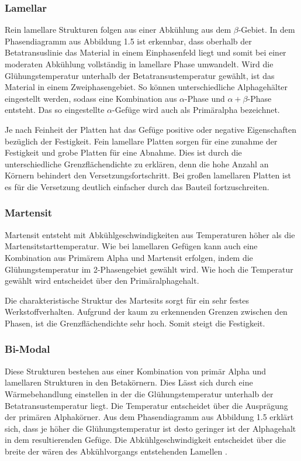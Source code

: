 \documentclass[a4paper, 11pt]{tubsreprt}
\begin{document}
\subsubsection{Lamellar}
Rein lamellare Strukturen folgen aus einer Abkühlung aus dem $\beta$-Gebiet. In dem Phasendiagramm aus Abbildung 1.5 ist erkennbar, dass oberhalb der Betatransuslinie das Material in einem Einphasenfeld liegt und somit bei einer moderaten Abkühlung vollständig in lamellare Phase umwandelt. Wird die Glühungstemperatur unterhalb der Betatransustemperatur gewählt, ist das Material in einem Zweiphasengebiet. So können unterschiedliche Alphagehälter eingestellt werden, sodass eine Kombination aus $\alpha$-Phase und $\alpha + \beta$-Phase entsteht. Das so eingestellte $\alpha$-Gefüge wird auch als Primäralpha bezeichnet. 


Je nach Feinheit der Platten hat das Gefüge positive oder negative Eigenschaften bezüglich der Festigkeit. Fein lamellare Platten sorgen für eine zunahme der Festigkeit und grobe Platten für eine Abnahme. Dies ist durch die unterschiedliche Grenzflächendichte zu erklären, denn die hohe Anzahl an Körnern behindert den Versetzungsfortschritt. Bei großen lamellaren Platten ist es für die Versetzung deutlich einfacher durch das Bauteil fortzuschreiten. 

\subsubsection{Martensit}
Martensit entsteht mit Abkühlgeschwindigkeiten aus Temperaturen höher als die Martensitstarttemperatur. Wie bei lamellaren Gefügen kann auch eine Kombination aus Primärem Alpha und Martensit erfolgen, indem die Glühungstemperatur im 2-Phasengebiet gewählt wird. Wie hoch die Temperatur gewählt wird entscheidet über den Primäralphagehalt. 

Die charakteristische Struktur des Martesits sorgt für ein sehr festes Werkstoffverhalten. Aufgrund der kaum zu erkennenden Grenzen zwischen den Phasen, ist die Grenzflächendichte sehr hoch. Somit steigt die Festigkeit.


\subsubsection{Bi-Modal}
Diese Strukturen bestehen aus einer Kombination von primär Alpha und lamellaren Strukturen in den Betakörnern. Dies Lässt sich durch eine Wärmebehandlung einstellen in der die Glühungstemperatur unterhalb der Betatransustemperatur liegt. Die Temperatur entscheidet über die Ausprägung der primären Alphakörner. Aus dem Phasendiagramm aus Abbildung 1.5 erklärt sich, dass je höher die Glühungstemperatur ist desto geringer ist der Alphagehalt in dem resultierenden Gefüge. Die Abkühlgeschwindigkeit entscheidet über die breite der wären des Abkühlvorgangs entstehenden Lamellen \cite{Luetjering2007}.
\end{document}
